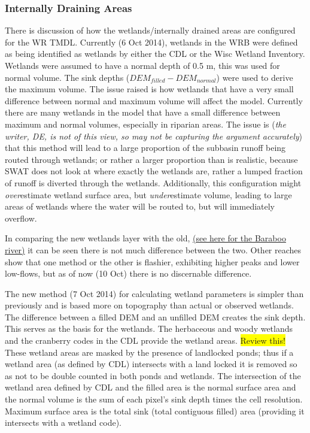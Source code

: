 \subsubsection{Internally Draining Areas}
	There is discussion of how the wetlands/internally drained areas are configured for the WR TMDL. Currently (6 Oct 2014), wetlands in the WRB were defined as being identified as wetlands by either the CDL or the Wisc Wetland Inventory. Wetlands were assumed to have a normal depth of 0.5 m, this was used for normal volume. The sink depths ($DEM_{filled} - DEM_{normal}$) were used to derive the maximum volume. The issue raised is how wetlands that have a very small difference between normal and maximum volume will affect the model. Currently there are many wetlands in the model that have a small difference between maximum and normal volumes, especially in riparian areas. The issue is (\emph{the writer, DE, is not of this view, so may not be capturing the argument accurately}) that this method will lead to a large proportion of the subbasin runoff being routed through  wetlands; or rather a larger proportion than is realistic, because SWAT does not look at where exactly the wetlands are, rather a lumped fraction of runoff is diverted through the wetlands. Additionally, this configuration might \textit{over}estimate wetland surface area, but \textit{under}estimate volume, leading to large areas of wetlands where the water will be routed to, but will immediately overflow.

	In comparing the new wetlands layer with the old, \href{run:T:/Projects/Wisconsin_River/Model_Documents/TMDL_report/figures/calibration_validation_figures/newVSold_wetlands/defaults_137.pdf}{(see here for the Baraboo river)} it can be seen there is not much difference between the two. Other reaches show that one method or the other is flashier, exhibiting higher peaks and lower low-flows, but as of now (10 Oct) there is no discernable difference. 

	The new method (7 Oct 2014) for calculating wetland parameters is simpler than previously and is based more on topography than actual or observed wetlands. The difference between a filled DEM and an unfilled DEM creates the sink depth. This serves as the basis for the wetlands. The herbaceous and woody wetlands and the cranberry codes in the CDL provide the wetland areas. \colorbox{yellow}{Review this!} These wetland areas are masked by the presence of landlocked ponds; thus if a wetland area (as defined by CDL) intersects with a land locked it is removed so as not to be double counted in both ponds and wetlands. The intersection of the wetland area defined by CDL and the filled area is the normal surface area and the normal volume is the sum of each pixel's sink depth times the cell resolution. Maximum surface area is the total sink (total contiguous filled) area (providing it intersects with a wetland code).
	
